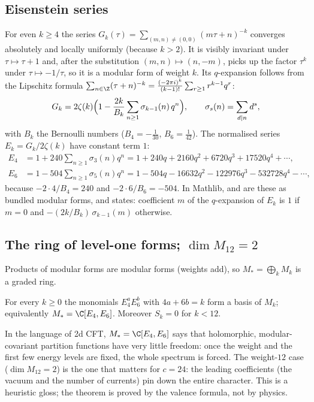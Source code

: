 \subsection{Eisenstein series}

For even $k\ge 4$ the series $G_k(\tau) = \sum_{(m,n)\ne(0,0)} (m\tau+n)^{-k}$ converges absolutely
and locally uniformly (because $k>2$). It is visibly invariant under $\tau\mapsto\tau+1$ and, after
the substitution $(m,n)\mapsto(n,-m)$, picks up the factor $\tau^k$ under $\tau\mapsto -1/\tau$, so it
is a modular form of weight $k$. Its $q$-expansion follows from the Lipschitz formula
$\sum_{n\in\Z}(\tau+n)^{-k} = \frac{(-2\pi i)^k}{(k-1)!}\sum_{r\ge1} r^{k-1}q^r$:
\begin{equation*}
  G_k = 2\zeta(k)\Bigl(1 - \frac{2k}{B_k}\sum_{n\ge1}\sigma_{k-1}(n)\,q^n\Bigr),
  \qquad \sigma_s(n) = \sum_{d\mid n} d^s,
\end{equation*}
with $B_k$ the Bernoulli numbers ($B_4 = -\tfrac1{30}$, $B_6 = \tfrac1{42}$). The normalised series
$E_k = G_k/2\zeta(k)$ have constant term $1$:
\begin{align*}
  E_4 &= 1 + 240\sum_{n\ge1}\sigma_3(n)q^n = 1 + 240q + 2160q^2 + 6720q^3 + 17520 q^4+\cdots,\\
  E_6 &= 1 - 504\sum_{n\ge1}\sigma_5(n)q^n = 1 - 504q - 16632q^2 - 122976q^3 - 532728q^4 - \cdots,
\end{align*}
because $-2\cdot4/B_4 = 240$ and $-2\cdot 6/B_6 = -504$. In Mathlib,  and
 are these as bundled modular forms, and
 states: coefficient $m$ of the $q$-expansion of $E_k$
is $1$ if $m = 0$ and $-(2k/B_k)\,\sigma_{k-1}(m)$ otherwise.

\subsection{The ring of level-one forms; \texorpdfstring{$\dim M_{12} = 2$}{dim M12 = 2}}

Products of modular forms are modular forms (weights add), so $M_* = \bigoplus_k M_k$ is a graded
ring.

\begin{theorem}[Structure of $M_*$]\label{ch05:thm:graded}
For every $k\ge0$ the monomials $E_4^aE_6^b$ with $4a+6b = k$ form a basis of $M_k$; equivalently
$M_* = \C[E_4,E_6]$. Moreover $S_k = 0$ for $k<12$.
\end{theorem}

\begin{physics}
In the language of 2d CFT, $M_*=\C[E_4,E_6]$ says that holomorphic, modular-covariant partition functions have very little freedom: once the weight and the first few energy levels are fixed, the whole spectrum is forced. The weight-$12$ case ($\dim M_{12}=2$) is the one that matters for $c=24$: the leading coefficients (the vacuum and the number of currents) pin down the entire character. This is a heuristic gloss; the theorem is proved by the valence formula, not by physics.
\end{physics}

